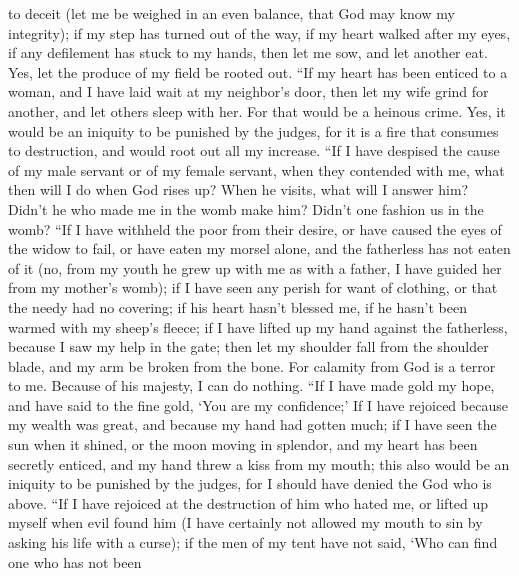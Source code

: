 to deceit  (let me be weighed in an even balance, that God
may know my integrity);  if my step has turned out of the
way, if my heart walked after my eyes, if any defilement has stuck to my
hands,  then let me sow, and let another eat. Yes, let the
produce of my field be rooted out.  ``If my heart has been
enticed to a woman, and I have laid wait at my neighbor's door,
 then let my wife grind for another, and let others sleep
with her.  For that would be a heinous crime. Yes, it would
be an iniquity to be punished by the judges,  for it is a
fire that consumes to destruction, and would root out all my increase.
 ``If I have despised the cause of my male servant or of my
female servant, when they contended with me,  what then
will I do when God rises up? When he visits, what will I answer him?
 Didn't he who made me in the womb make him? Didn't one
fashion us in the womb?  ``If I have withheld the poor from
their desire, or have caused the eyes of the widow to fail,
 or have eaten my morsel alone, and the fatherless has not
eaten of it  (no, from my youth he grew up with me as with
a father, I have guided her from my mother's womb);  if I
have seen any perish for want of clothing, or that the needy had no
covering;  if his heart hasn't blessed me, if he hasn't
been warmed with my sheep's fleece;  if I have lifted up my
hand against the fatherless, because I saw my help in the gate;
 then let my shoulder fall from the shoulder blade, and my
arm be broken from the bone.  For calamity from God is a
terror to me. Because of his majesty, I can do nothing. 
``If I have made gold my hope, and have said to the fine gold, `You are
my confidence;'  If I have rejoiced because my wealth was
great, and because my hand had gotten much;  if I have seen
the sun when it shined, or the moon moving in splendor, 
and my heart has been secretly enticed, and my hand threw a kiss from my
mouth;  this also would be an iniquity to be punished by
the judges, for I should have denied the God who is above. 
``If I have rejoiced at the destruction of him who hated me, or lifted
up myself when evil found him  (I have certainly not
allowed my mouth to sin by asking his life with a curse); 
if the men of my tent have not said, `Who can find one who has not been
